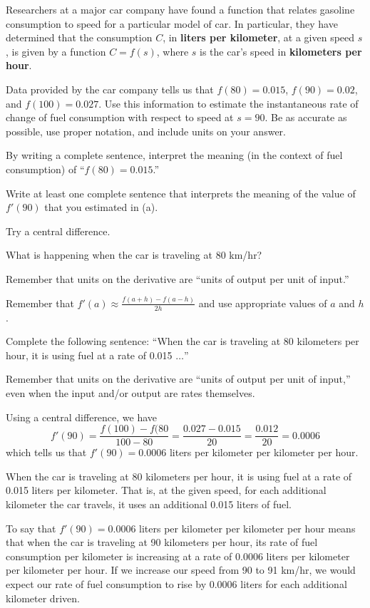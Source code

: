 \begin{activity} \label{A:2.1.7}
Researchers at a major car company have found a function that relates gasoline consumption to speed for a particular model of car.  In particular, they have determined that the consumption $C$, in {\bfseries liters per kilometer}, at a given speed $s$, is given by a function $C = f(s)$, where $s$ is the car's speed in {\bf kilometers per hour}. 
	\ba
	  \item Data provided by the car company tells us that $f(80) = 0.015$, $f(90) = 0.02$, and $f(100) = 0.027$.  Use this information to estimate the instantaneous rate of change of fuel consumption with respect to speed at $s = 90$.  Be as accurate as possible, use proper notation, and include units on your answer.
	  \item By writing a complete sentence, interpret the meaning (in the context of fuel consumption) of ``$f(80) = 0.015$.'' 
	  \item Write at least one complete sentence that interprets the meaning of the value of $f'(90)$ that you estimated in (a).
	\ea
\end{activity}
\begin{smallhint}
\ba
	\item Try a central difference.
	\item What is happening when the car is traveling at 80 km/hr?
	\item Remember that units on the derivative are ``units of output per unit of input.''
\ea
\end{smallhint}
\begin{bighint}
\ba
	\item Remember that $f'(a) \approx \frac{f(a+h)-f(a-h)}{2h}$ and use appropriate values of $a$ and $h$.
	\item Complete the following sentence: ``When the car is traveling at 80 kilometers per hour, it is using fuel at a rate of 0.015 $\ldots$''
	\item Remember that units on the derivative are ``units of output per unit of input,'' even when the input and/or output are rates themselves.
\ea
\end{bighint}
\begin{activitySolution}
\ba
	\item Using a central difference, we have
	$$f'(90) = \frac{f(100) - f(80}{100-80} = \frac{0.027 - 0.015}{20} = \frac{0.012}{20} = 0.0006$$
	which tells us that $f'(90) = 0.0006$ liters per kilometer per kilometer per hour.
	\item When the car is traveling at 80 kilometers per hour, it is using fuel at a rate of 0.015 liters per kilometer.  That is, at the given speed, for each additional kilometer the car travels, it uses an additional 0.015 liters of fuel.
	\item To say that $f'(90) = 0.0006$ liters per kilometer per kilometer per hour means that when the car is traveling at 90 kilometers per hour, its rate of fuel consumption per kilometer is increasing at a rate of 0.0006 liters per kilometer per kilometer per hour.  If we increase our speed from 90 to 91 km/hr, we would expect our rate of fuel consumption to rise by 0.0006 liters for each additional kilometer driven.
\ea
\end{activitySolution}
\aftera